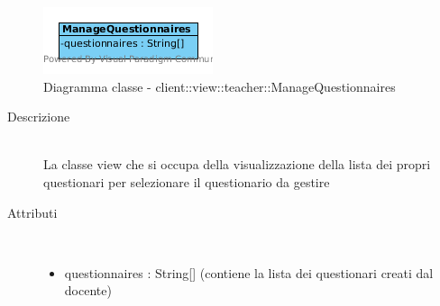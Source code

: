 \vspace{0.5cm}
\hypertarget{client::view::teacher::ManageQuestionnaires}{}
\begin{center}
			\begin{figure}[H]
				\centering \includegraphics[scale=4, max width=\textwidth, max height=\myheight]{../img/diagrammiClassi/client/view/teacher/ManageQuestionnaires.png}
				\caption{Diagramma classe - client::view::teacher::ManageQuestionnaires}
			\end{figure}
		\end{center}\begin{description}
\item[Descrizione] \hfill \\
 La classe view che si occupa della visualizzazione della lista dei propri questionari per selezionare il questionario da gestire
\item[Attributi] \hfill \\
 \vspace{-7mm}
\begin{itemize}
\item questionnaires : String[] (contiene la lista  dei questionari creati dal docente)
\end{itemize}

\end{description}

\vspace{0.5cm}
